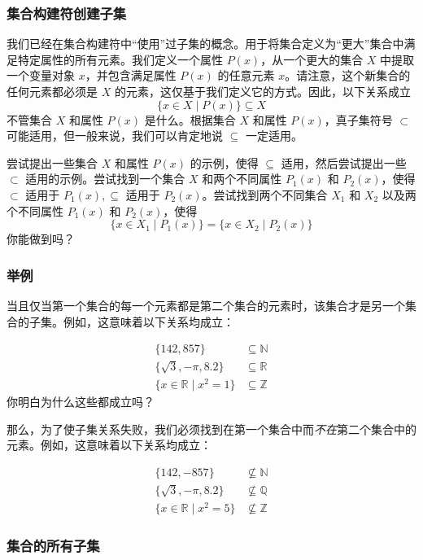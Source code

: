 \subsubsection*{集合构建符创建子集}

我们已经在集合构建符中``使用''过子集的概念。用于将集合定义为``更大''集合中满足特定属性的所有元素。我们定义一个属性 $P(x)$，从一个更大的集合 $X$ 中提取一个变量对象 $x$，并包含满足属性 $P(x)$ 的任意元素 $x$。请注意，这个新集合的任何元素都必须是 $X$ 的元素，这仅基于我们定义它的方式。因此，以下关系成立
\[\{x \in X \mid P(x)\} \subseteq X\]
不管集合 $X$ 和属性 $P(x)$ 是什么。根据集合 $X$ 和属性 $P(x)$，真子集符号 $\subset$ 可能适用，但一般来说，我们可以肯定地说 $\subseteq$ 一定适用。

尝试提出一些集合 $X$ 和属性 $P(x)$ 的示例，使得 $\subseteq$ 适用，然后尝试提出一些 $\subset$ 适用的示例。尝试找到一个集合 $X$ 和两个不同属性 $P_1(x)$ 和 $P_2(x)$，使得 $\subset$ 适用于 $P_1(x), \subseteq$ 适用于 $P_2(x)$。尝试找到两个不同集合 $X_1$ 和 $X_2$ 以及两个不同属性 $P_1(x)$ 和 $P_2(x)$，使得
\[\{x \in X_1 \mid P_1(x)\} = \{x \in X_2 \mid P_2(x)\}\]
你能做到吗？

\subsubsection*{举例}

当且仅当第一个集合的每一个元素都是第二个集合的元素时，该集合才是另一个集合的子集。例如，这意味着以下关系均成立：

\begin{align*}
    \{142, 857\} &\subseteq \mathbb{N} \\
    \{\sqrt{3}, -\pi, 8.2\} &\subseteq \mathbb{R} \\
    \{x \in \mathbb{R} \mid x^2 = 1\} &\subseteq \mathbb{Z}
\end{align*}
你明白为什么这些都成立吗？

那么，为了使子集关系失败，我们必须找到在第一个集合中而\textit{不在}第二个集合中的元素。例如，这意味着以下关系均成立：

\begin{align*}
    \{142, -857\} &\nsubseteq \mathbb{N} \\
    \{\sqrt{3}, -\pi, 8.2\} &\nsubseteq \mathbb{Q} \\
    \{x \in \mathbb{R} \mid x^2 = 5\} &\nsubseteq \mathbb{Z}
\end{align*}

\subsubsection*{集合的所有子集}

